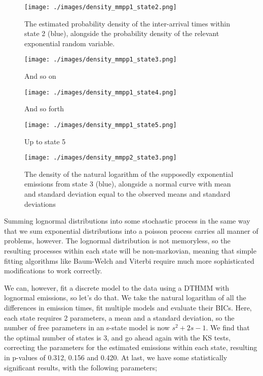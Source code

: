 \begin{figure}[h!]
\texttt{[image: ./images/density\_mmpp1\_state2.png]}
\caption{The estimated probability density of the inter-arrival times within state 2 (blue), alongside the probability density of the relevant exponential random variable.}
\label{density_mmpp1_state2}
\end{figure}

\begin{figure}[h!]
\texttt{[image: ./images/density\_mmpp1\_state3.png]}
\caption{And so on}
\label{density_mmpp1_state3}
\end{figure}

\begin{figure}[h!]
\texttt{[image: ./images/density\_mmpp1\_state4.png]}
\caption{And so forth}
\label{density_mmpp1_state4}
\end{figure}

\begin{figure}[h!]
\texttt{[image: ./images/density\_mmpp1\_state5.png]}
\caption{Up to state 5}
\label{density_mmpp1_state5}
\end{figure}

\begin{figure}[h!]
\texttt{[image: ./images/density\_mmpp2\_state3.png]}
\caption{The density of the natural logarithm of the supposedly exponential emissions from state 3 (blue), alongside a normal curve with mean and standard deviation equal to the observed means and standard deviations}
\label{density_mmpp2_state3}
\end{figure}

\clearpage

Summing lognormal distributions into some stochastic process in the same way that we sum exponential distributions into a poisson process carries all manner of problems, however. The lognormal distribution is not memoryless, so the resulting processes within each state will be non-markovian, meaning that simple fitting algorithms like Baum-Welch and Viterbi require much more sophisticated modifications to work correctly.

We can, however, fit a discrete model to the data using a DTHMM with lognormal emissions, so let's do that. We take the natural logarithm of all the differences in emission times, fit multiple models and evaluate their BICs. Here, each state requires 2 parameters, a mean and a standard deviation, so the number of free parameters in an s-state model is now $s^2+2s-1$. We find that the optimal number of states is 3, and go ahead again with the KS tests, correcting the parameters for the estimated emissions within each state, resulting in p-values of 0.312, 0.156 and 0.420. At last, we have some statistically significant results, with the following parameters;

